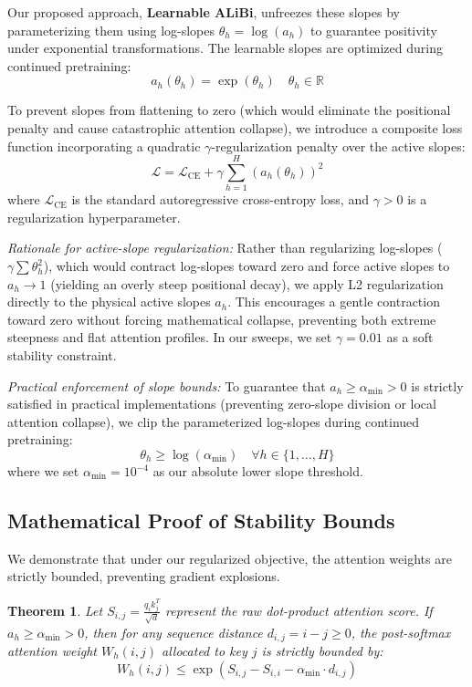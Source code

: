 \documentclass[11pt,journal,compsoc]{IEEEtran}
\newtheorem{theorem}{Theorem}
\begin{document}
Our proposed approach, \textbf{Learnable ALiBi}, unfreezes these slopes by parameterizing them using log-slopes $\theta_{h} = \log(a_{h})$ to guarantee positivity under exponential transformations. The learnable slopes are optimized during continued pretraining:
\begin{equation}
    a_{h}(\theta_{h}) = \exp(\theta_{h}) \quad \theta_{h} \in \mathbb{R}
\end{equation}

To prevent slopes from flattening to zero (which would eliminate the positional penalty and cause catastrophic attention collapse), we introduce a composite loss function incorporating a quadratic $\gamma$-regularization penalty over the active slopes:
\begin{equation}
    \mathcal{L} = \mathcal{L}_{\text{CE}} + \gamma \sum_{h=1}^{H} \left( a_{h}(\theta_{h}) \right)^{2}
\end{equation}
where $\mathcal{L}_{\text{CE}}$ is the standard autoregressive cross-entropy loss, and $\gamma > 0$ is a regularization hyperparameter.

\textit{Rationale for active-slope regularization:} Rather than regularizing log-slopes ($\gamma \sum \theta_h^2$), which would contract log-slopes toward zero and force active slopes to $a_h \to 1$ (yielding an overly steep positional decay), we apply L2 regularization directly to the physical active slopes $a_h$. This encourages a gentle contraction toward zero without forcing mathematical collapse, preventing both extreme steepness and flat attention profiles. In our sweeps, we set $\gamma = 0.01$ as a soft stability constraint.

\textit{Practical enforcement of slope bounds:} To guarantee that $a_h \ge \alpha_{\text{min}} > 0$ is strictly satisfied in practical implementations (preventing zero-slope division or local attention collapse), we clip the parameterized log-slopes during continued pretraining:
\begin{equation}
    \theta_{h} \ge \log(\alpha_{\text{min}}) \quad \forall h \in \{1, \dots, H\}
\end{equation}
where we set $\alpha_{\text{min}} = 10^{-4}$ as our absolute lower slope threshold.

\subsection{Mathematical Proof of Stability Bounds}
We demonstrate that under our regularized objective, the attention weights are strictly bounded, preventing gradient explosions.
\begin{theorem}
Let $S_{i, j} = \frac{q_{i} k_{j}^{T}}{\sqrt{d}}$ represent the raw dot-product attention score. If $a_{h} \ge \alpha_{\text{min}} > 0$, then for any sequence distance $d_{i, j} = i - j \ge 0$, the post-softmax attention weight $W_{h}(i, j)$ allocated to key $j$ is strictly bounded by:
\begin{equation}
    W_{h}(i, j) \le \exp\left( S_{i, j} - S_{i, i} - \alpha_{\text{min}} \cdot d_{i, j} \right)
\end{equation}
\end{theorem}
\end{document}
